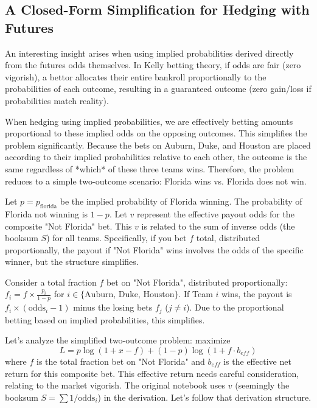 \documentclass{article}
\begin{document}
\subsection{A Closed-Form Simplification for Hedging with Futures}

An interesting insight arises when using implied probabilities derived directly from the futures odds themselves. In Kelly betting theory, if odds are fair (zero vigorish), a bettor allocates their entire bankroll proportionally to the probabilities of each outcome, resulting in a guaranteed outcome (zero gain/loss if probabilities match reality).

When hedging using implied probabilities, we are effectively betting amounts proportional to these implied odds on the opposing outcomes. This simplifies the problem significantly. Because the bets on Auburn, Duke, and Houston are placed according to their implied probabilities relative to each other, the outcome is the same regardless of *which* of these three teams wins. Therefore, the problem reduces to a simple two-outcome scenario: Florida wins vs. Florida does not win.

Let $p = p_{\text{florida}}$ be the implied probability of Florida winning. The probability of Florida not winning is $1-p$. Let $v$ represent the effective payout odds for the composite "Not Florida" bet. This $v$ is related to the sum of inverse odds (the booksum $S$) for all teams. Specifically, if you bet $f$ total, distributed proportionally, the payout if "Not Florida" wins involves the odds of the specific winner, but the structure simplifies.

Consider a total fraction $f$ bet on "Not Florida", distributed proportionally: $f_i = f \times \frac{p_i}{1-p}$ for $i \in \{\text{Auburn, Duke, Houston}\}$. If Team $i$ wins, the payout is $f_i \times (\text{odds}_i - 1)$ minus the losing bets $f_j$ ($j \ne i$). Due to the proportional betting based on implied probabilities, this simplifies.

Let's analyze the simplified two-outcome problem: maximize
\begin{equation}
L = p \log(1 + x - f) + (1-p) \log(1 + f \cdot b_{eff})
\end{equation}
where $f$ is the total fraction bet on "Not Florida" and $b_{eff}$ is the effective net return for this composite bet. This effective return needs careful consideration, relating to the market vigorish. The original notebook uses $v$ (seemingly the booksum $S = \sum 1/\text{odds}_i$) in the derivation. Let's follow that derivation structure.
\end{document}
